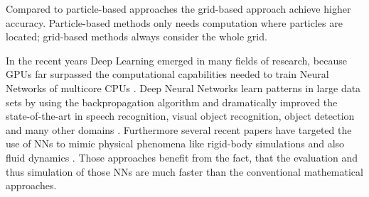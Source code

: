 \newpage
\par Compared to particle-based approaches the grid-based approach achieve higher accuracy. Particle-based methods only needs computation where particles are located; grid-based methods always consider the whole grid.
\par In the recent years Deep Learning emerged in many fields of research, because GPUs far surpassed the computational capabilities needed to train Neural Networks of multicore CPUs \parencite{raina2009large}. Deep Neural Networks learn patterns in large data sets by using the backpropagation algorithm and dramatically improved the state-of-the-art in speech recognition, visual object recognition, object detection and many other domains \parencite{lecun2015deep}. Furthermore several recent papers have targeted the use of NNs to mimic physical phenomena like rigid-body simulations \parencite{chang2016compositional} and also fluid dynamics \parencite{tompson2017accelerating}  \parencite{chu2017data} \parencite{schenck2018spnets}. Those approaches benefit from the fact, that the evaluation and thus simulation of those NNs are much faster than the conventional mathematical approaches.